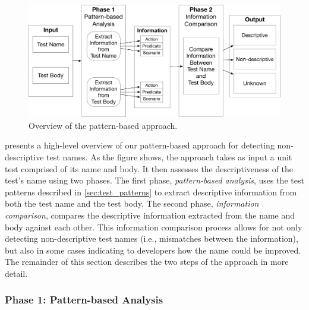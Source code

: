 \begin{figure}[t]
  \centering
  \includegraphics[scale=0.25]{figures/overview_of_approach.pdf}
  \caption{Overview of the pattern-based approach.}
  \label{fig:approach}
\end{figure}

 presents a high-level overview of our pattern-based approach for detecting non-descriptive test names.
%
As the figure shows, the approach takes as input a unit test comprised of its name and body.
%
It then assesses the descriptiveness of the test's name using two phases.
%
The first phase, \emph{pattern-based analysis}, uses the test patterns described in \cref{sec:test_patterns} to extract descriptive information from both the test name and the test body.
%
The second phase, \emph{information comparison}, compares the descriptive information extracted from the name and body against each other.
%
This information comparison process allows for not only detecting non-descriptive test names (i.e., mismatches between the information), but also in some cases indicating to developers how the name could be improved.
%
The remainder of this section describes the two steps of the approach in more detail.

\subsubsection{Phase 1: Pattern-based Analysis}
\label{sec:Pattern-based-Analysis}

